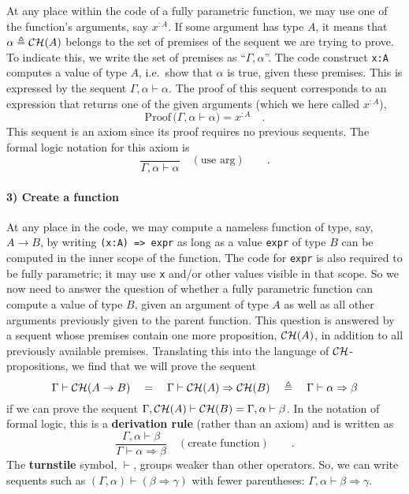 At any place within the code of a fully parametric function, we may
use one of the function\textsf{'}s arguments, say $x^{:A}$. If some argument
has type $A$, it means that $\alpha\triangleq{\cal CH}(A)$ belongs
to the set of premises of the sequent we are trying to prove. To indicate
this, we write the set of premises as \textsf{``}$\Gamma,\alpha$\textsf{''}. The
code construct \lstinline!x:A! computes a value of type $A$, i.e.~show
that $\alpha$ is true, given these premises. This is expressed by
the sequent $\Gamma,\alpha\vdash\alpha$. The proof of this sequent
corresponds to an expression that returns one of the given arguments
(which we here called $x^{:A}$),
\[
\text{Proof}\,\big(\Gamma,\alpha\vdash\alpha\big)=x^{:A}\quad.
\]
This sequent is an axiom since its proof requires no previous sequents.
The formal logic notation for this axiom is
\[
\frac{~}{\Gamma,\alpha\vdash\alpha}\quad(\text{use arg})\quad\quad.
\]


\paragraph{3) Create a function}

At any place in the code, we may compute a nameless function of type,
say, $A\rightarrow B$, by writing \lstinline!(x:A) => expr! as long
as a value \lstinline!expr! of type $B$ can be computed in the inner
scope of the function. The code for \lstinline!expr! is also required
to be fully parametric; it may use \lstinline!x! and/or other values
visible in that scope. So we now need to answer the question of whether
a fully parametric function can compute a value of type $B$, given
an argument of type $A$ as well as all other arguments previously
given to the parent function. This question is answered by a sequent
whose premises contain one more proposition, ${\cal CH}(A)$, in addition
to all previously available premises. Translating this into the language
of ${\cal CH}$-propositions, we find that we will prove the sequent
\[
\Gamma\vdash{\cal CH}(A\rightarrow B)\quad=\quad\Gamma\vdash{\cal CH}(A)\Rightarrow{\cal CH}(B)\quad\triangleq\quad\Gamma\vdash\alpha\Rightarrow\beta
\]
if we can prove the sequent $\Gamma,{\cal CH}(A)\vdash{\cal CH}(B)=\Gamma,\alpha\vdash\beta$.
In the notation of formal logic, this is a \textbf{derivation rule}
(rather than an axiom) and is written as
\[
\frac{\Gamma,\alpha\vdash\beta}{\Gamma\vdash\alpha\Rightarrow\beta}\quad(\text{create function})\quad\quad.
\]
The \textbf{turnstile} symbol, $\vdash$,
groups weaker than other operators. So, we can write sequents such
as $(\Gamma,\alpha)\vdash(\beta\Rightarrow\gamma)$ with fewer parentheses:
$\Gamma,\alpha\vdash\beta\Rightarrow\gamma$.

